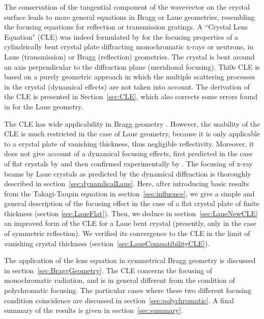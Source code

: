 \documentclass[preprint]{iucr}              %
\begin{document}
The conservation of the tangential component of the wavevector on the crystal surface leads to more general equations in Bragg or Laue geometries, resembling the focusing equations for reflection or transmission gratings.
A ``Crystal Lens Equation" (CLE) was indeed formulated by \cite{CK} for the focusing properties of a cylindrically bent crystal plate diffracting monochromatic x-rays or neutrons, in Laue (transmission) or Bragg (reflection) geometries. The crystal is bent around an axis perpendicular to the diffraction plane (meridional focusing). Thi0s CLE is based on a purely geometric approach in which the multiple scattering processes in the crystal (dynamical effects) are not taken into account. 
The derivation of the CLE is presented in Section~\ref{sec:CLE}, which also corrects
some errors found in \cite{CK} for the Laue geometry.

The CLE has wide applicability in Bragg geometry \cite{Caciuffo1987}. However, the usability of the CLE is much restricted in the case of Laue geometry, because it is only applicable to a crystal plate of vanishing thickness, thus negligible reflectivity. Moreover, it does not give account of a dynamical focusing effects, first  predicted in the case of flat crystals by \cite{AfanasevKohn1977} and then confirmed experimentally by \cite{Aristov1978, Aristov1980}. The focusing of x-ray beams by Laue crystals as predicted by the dynamical diffraction is  thoroughly described in section~\ref{sec:dynamlicalLaue}. Here, after introducing basic results from the Takagi-Taupin equation in section~\ref{sec:influence}, we give a simple and general description of the focusing effect in the case of a flat crystal plate of finite thickness (section \ref{sec:LaueFlat}). Then, we deduce in section~\ref{sec:LaueNewCLE} an improved form of the CLE for a Laue bent crystal (presently, only in the case of symmetric reflection). We verified its convergence to the CLE in the limit of vanishing crystal thickness (section~\ref{sec:LaueCompatibilityCLE}). 

The application of the lens equation in symmetrical Bragg geometry is discussed in section~\ref{sec:BraggGeometry}. %
The CLE concerns the focusing of monochromatic radiation, and is in general different from the condition of polychromatic focusing. The particular cases where these two different focusing condition coincidence  are discussed in section~\ref{sec:polychromatic}. A final summary of the results is given in section~\ref{sec:summary}.   
\end{document}
